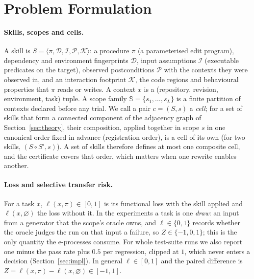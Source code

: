 \section{Problem Formulation}
\label{sec:problem}

\paragraph{Skills, scopes and cells.}
A skill is $S=\langle \pi,\mathcal{D},\mathcal{I},\mathcal{P},\mathcal{K}\rangle$: a procedure $\pi$ (a parameterised edit
program), dependency and environment fingerprints $\mathcal{D}$, input assumptions $\mathcal{I}$ (executable predicates on the
target), observed postconditions $\mathcal{P}$ with the contexts they were observed in, and an interaction footprint
$\mathcal{K}$, the code regions and behavioural properties that $\pi$ reads or writes.
A context $x$ is a (repository, revision, environment, task) tuple.
A scope family $\mathbb{S}=\{s_1,\dots,s_L\}$ is a finite partition of contexts declared before any trial.
We call a pair $c=(S,s)$ a \emph{cell}; for a set of skills that form a connected component of the adjacency graph of
Section~\ref{sec:theory}, their composition, applied together in scope $s$ in one canonical order fixed in advance (registration
order), is a cell of its own (for two skills, $(S\circ S',s)$).  A set of skills therefore defines at most one composite cell, and
the certificate covers that order, which matters when one rewrite enables another.

\paragraph{Loss and selective transfer risk.}
For a task $x$, $\ell(x,\pi)\in[0,1]$ is its functional loss with the skill applied and $\ell(x,\varnothing)$ the loss
without it.  In the experiments a task is one \emph{draw}: an input from a generator that the scope's oracle owns, and
$\ell\in\{0,1\}$ records whether the oracle judges the run on that input a failure, so $Z\in\{-1,0,1\}$; this is the only
quantity the e-processes consume.  For whole test-suite runs we also report one minus the pass rate plus $0.5$ per regression,
clipped at $1$, which never enters a decision (Section~\ref{sec:impl}).  In general $\ell\in[0,1]$ and the paired difference is
$Z=\ell(x,\pi)-\ell(x,\varnothing)\in[-1,1]$.

